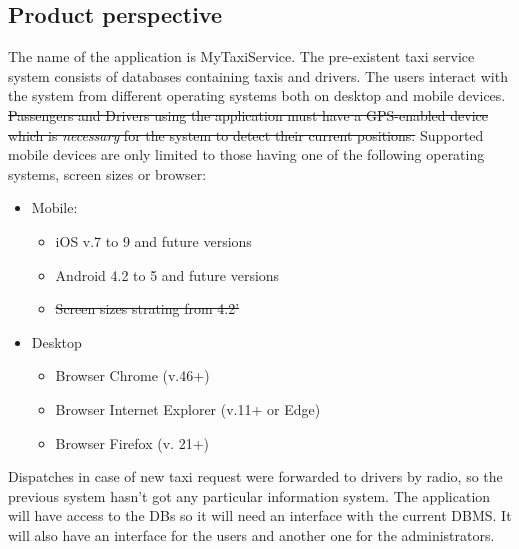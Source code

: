 \subsection{Product perspective}
The name of the application is MyTaxiService.
The pre-existent taxi service system consists of databases containing taxis and drivers. 
The users interact with the system from different operating systems both on desktop and mobile devices. \sout{ Passengers and Drivers using the application must have a GPS-enabled device which is \textit{necessary }for the system to detect their current positions.}
Supported mobile devices are only limited to those having one of the following operating systems, screen sizes or browser:
\begin{itemize}
\item Mobile:
\begin{itemize}
\item iOS v.7 to 9 and future versions
\item Android 4.2 to 5 and future versions
\item \sout{Screen sizes strating from 4.2'}
\end{itemize}
\item Desktop
\begin{itemize}
\item Browser Chrome (v.46+)
\item Browser Internet Explorer (v.11+ or Edge)
\item Browser Firefox (v. 21+)
\end{itemize}
\end{itemize}
Dispatches in case of new taxi request were forwarded to drivers by radio, so the previous system hasn't got any particular information system.
The application will have access to the DBs so it will need an interface with the current DBMS.
It will also have an interface for the users and another one for the administrators.

